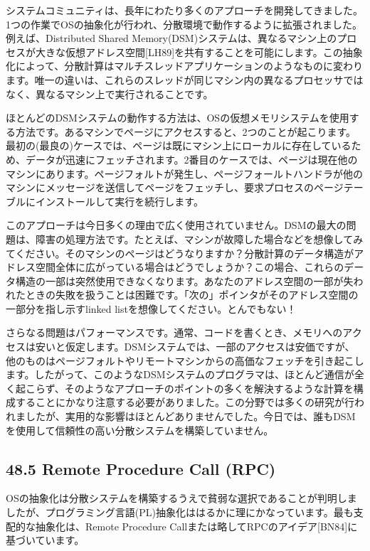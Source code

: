 システムコミュニティは、長年にわたり多くのアプローチを開発してきました。1つの作業でOSの抽象化が行われ、分散環境で動作するように拡張されました。例えば、Distributed
Shared
Memory(DSM)システムは、異なるマシン上のプロセスが大きな仮想アドレス空間{[}LH89{]}を共有することを可能にします。この抽象化によって、分散計算はマルチスレッドアプリケーションのようなものに変わります。唯一の違いは、これらのスレッドが同じマシン内の異なるプロセッサではなく、異なるマシン上で実行されることです。

ほとんどのDSMシステムの動作する方法は、OSの仮想メモリシステムを使用する方法です。あるマシンでページにアクセスすると、2つのことが起こります。最初の(最良の)ケースでは、ページは既にマシン上にローカルに存在しているため、データが迅速にフェッチされます。2番目のケースでは、ページは現在他のマシンにあります。ページフォルトが発生し、ページフォールトハンドラが他のマシンにメッセージを送信してページをフェッチし、要求プロセスのページテーブルにインストールして実行を続行します。

このアプローチは今日多くの理由で広く使用されていません。DSMの最大の問題は、障害の処理方法です。たとえば、マシンが故障した場合などを想像してみてください。そのマシンのページはどうなりますか？分散計算のデータ構造がアドレス空間全体に広がっている場合はどうでしょうか？この場合、これらのデータ構造の一部は突然使用できなくなります。あなたのアドレス空間の一部が失われたときの失敗を扱うことは困難です。「次の」ポインタがそのアドレス空間の一部分を指し示すlinked
listを想像してください。とんでもない！

さらなる問題はパフォーマンスです。通常、コードを書くとき、メモリへのアクセスは安いと仮定します。DSMシステムでは、一部のアクセスは安価ですが、他のものはページフォルトやリモートマシンからの高価なフェッチを引き起こします。したがって、このようなDSMシステムのプログラマは、ほとんど通信が全く起こらず、そのようなアプローチのポイントの多くを解決するような計算を構成することにかなり注意する必要がありました。この分野では多くの研究が行われましたが、実用的な影響はほとんどありませんでした。今日では、誰もDSMを使用して信頼性の高い分散システムを構築していません。

\hypertarget{remote-procedure-call-rpc}{%
\subsection*{48.5 Remote Procedure Call
(RPC)}\label{remote-procedure-call-rpc}}

OSの抽象化は分散システムを構築するうえで貧弱な選択であることが判明しましたが、プログラミング言語(PL)抽象化ははるかに理にかなっています。最も支配的な抽象化は、Remote
Procedure Callまたは略してRPCのアイデア{[}BN84{]}に基づいています。

